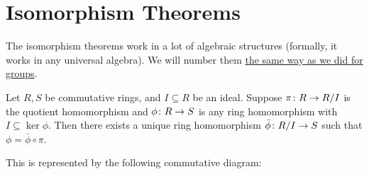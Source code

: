 \section{Isomorphism Theorems}

\begin{remark}
    The isomorphism theorems work in a lot of algebraic structures
    (formally, it works in any universal algebra).
    We will number them \hyperref[rmk:iso-numbering]{the same way as we did for groups}.
\end{remark}

\begin{theorem}\label{thm:univ-prop-quotient-ring}
    Let \(R,S\) be commutative rings,
    and \(I \subseteq R\) be an ideal.
    Suppose \(\pi\colon R\to R/I\) is the quotient homomorphism
    and \(\phi\colon R\to S\) is any ring homomorphism
    with \(I \subseteq \ker\phi\).
    Then there exists a unique ring homomorphism
    \(\bar{\phi}\colon R/I\to S\) such that \(\phi = \bar{\phi}\circ\pi\).

    This is represented by the following commutative diagram:
    \begin{center}
    \end{center}
\end{theorem}
